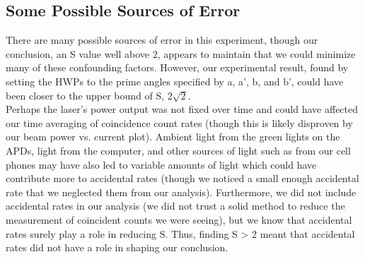 \documentclass{article}
\begin{document}
    \subsection{Some Possible Sources of Error}
    There are many possible sources of error in this experiment, though our conclusion, an S value well above 2, appears to maintain that we could minimize many of these confounding factors. However, our experimental result, found by setting the HWPs to the prime angles specified by a, a', b, and b', could have been closer to the upper bound of S, $2\sqrt{2}$.
    \\\indent Perhaps the laser's power output was not fixed over time and could have affected our time averaging of coincidence count rates (though this is likely disproven by our beam power vs. current plot). Ambient light from the green lights on the APDs, light from the computer, and other sources of light such as from our cell phones may have also led to variable amounts of light which could have contribute more to accidental rates (though we noticed a small enough accidental rate that we neglected them from our analysis). Furthermore, we did not include accidental rates in our analysis (we did not trust a solid method to reduce the measurement of coincident counts we were seeing), but we know that accidental rates surely play a role in reducing S. Thus, finding S > 2 meant that accidental rates did not have a role in shaping our conclusion. 
\end{document}
